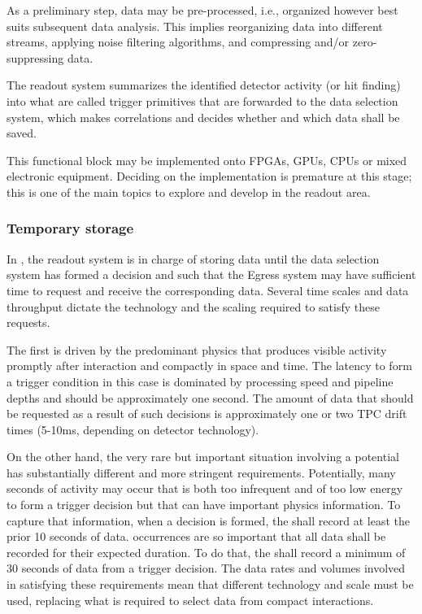 As a preliminary step, data may be pre-processed, i.e., organized however best suits subsequent data analysis. This implies reorganizing data into different streams, applying noise filtering algorithms, and compressing and/or zero-suppressing data.

The readout system summarizes the identified detector activity (or hit finding) into what are called trigger primitives that are forwarded to the data selection system, which makes correlations and decides whether and which data shall be saved.

This functional block may be implemented onto FPGAs, GPUs, CPUs or mixed electronic equipment.  Deciding on the implementation is premature at this stage; this is one of the main topics to explore and develop in the readout area.

\subsubsection{Temporary storage}

In , the readout system is in charge of storing data until the data selection system has formed a decision and such that the Egress system may have sufficient time to request and receive the corresponding data.
Several time scales and data throughput dictate the technology and the scaling required to satisfy these requests.

The first  is driven by the predominant physics that produces visible activity promptly after interaction and compactly in space and time. 
The latency to form a trigger condition in this case is dominated by processing speed and pipeline depths and should be approximately one second.  The amount of data that should be requested as a result of such decisions  is approximately one or two TPC drift times (5-10\si{\milli\second}, depending on detector technology).

On the other hand, the very rare but important situation involving a potential  has substantially different and more stringent requirements. 
Potentially, many seconds of activity may occur that is both too infrequent and of too low energy to form a trigger decision but that can have important physics information. 
To capture that information, when a  decision is formed, the  shall record at least the prior 10 seconds of data. 
 occurrences are so important that all data shall be recorded for their expected duration. 
To do that, the  shall record a minimum of 30 seconds of data from a  trigger decision. 
The data rates and volumes involved in satisfying these requirements mean that different technology and scale must be used, replacing what is required to select data from compact interactions.

